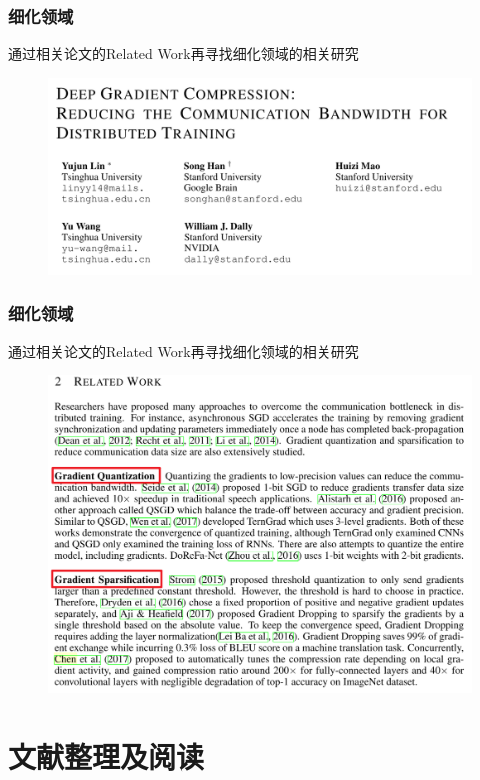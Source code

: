 \documentclass[hyperref={pdfpagelabels=false}]{beamer}
\begin{document}
\begin{frame}
	\frametitle{细化领域}
	通过相关论文的Related Work再寻找细化领域的相关研究
	\begin{figure}
		\centering
		\includegraphics[height=0.6\textheight]{./figure/4.png}
	\end{figure}
\end{frame}

\begin{frame}
	\frametitle{细化领域}
	通过相关论文的Related Work再寻找细化领域的相关研究
	\begin{figure}
		\centering
		\includegraphics[height=0.8\textheight]{./figure/5.png}
	\end{figure}
\end{frame}

\section{文献整理及阅读}
\begin{frame}
	\tableofcontents[currentsection]
\end{frame} 
\end{document}
